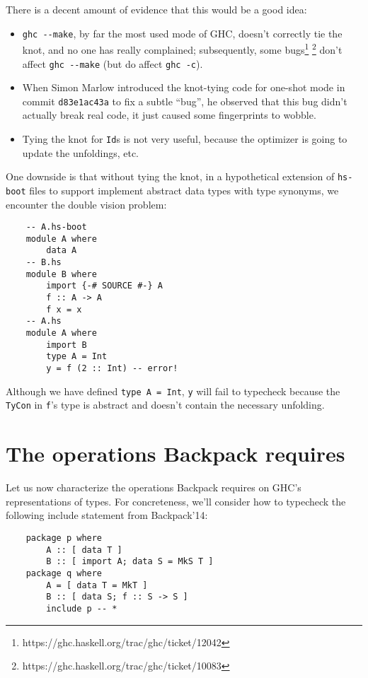 There is a decent amount of evidence that this would be a good
idea:

\begin{itemize}
    \item \verb|ghc --make|, by far the most used mode of GHC,
    doesn't correctly tie the knot, and no one has really complained;
    subsequently, some bugs\footnote{https://ghc.haskell.org/trac/ghc/ticket/12042}%
\footnote{https://ghc.haskell.org/trac/ghc/ticket/10083}
    don't affect \verb|ghc --make| (but do affect \verb|ghc -c|).
    \item When Simon Marlow introduced the knot-tying code for
one-shot mode in commit \verb|d83e1ac43a| to fix a subtle ``bug'',
he observed that this bug didn't actually break real code, it just
caused some fingerprints to wobble.
    \item Tying the knot for \verb|Id|s is not very useful,
    because the optimizer is going to update the unfoldings, etc.
\end{itemize}

\noindent
One downside is that without tying the knot, in a hypothetical
extension of \verb|hs-boot| files to support implement abstract
data types with type synonyms, we encounter the double vision problem:

\begin{verbatim}
    -- A.hs-boot
    module A where
        data A
    -- B.hs
    module B where
        import {-# SOURCE #-} A
        f :: A -> A
        f x = x
    -- A.hs
    module A where
        import B
        type A = Int
        y = f (2 :: Int) -- error!
\end{verbatim}

\noindent
Although we have defined \verb|type A = Int|, \verb|y| will fail to
typecheck because the \verb|TyCon| in \verb|f|'s type is abstract and
doesn't contain the necessary unfolding.

\section{The operations Backpack requires}

Let us now characterize the operations Backpack requires on
GHC's representations of types.  For concreteness, we'll consider
how to typecheck the following \textsf{include} statement from Backpack'14:

\begin{verbatim}
    package p where
        A :: [ data T ]
        B :: [ import A; data S = MkS T ]
    package q where
        A = [ data T = MkT ]
        B :: [ data S; f :: S -> S ]
        include p -- *
\end{verbatim}


